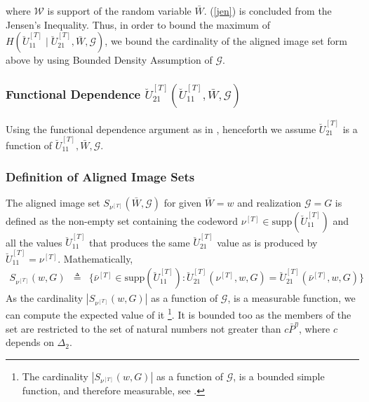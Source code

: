 \documentclass[11pt]{article}
\begin{document}
where $\mathcal{W}$ is support of the random variable $\bar{W}$. (\ref{jen}) is concluded from the Jensen's Inequality. Thus, in order to bound the maximum of $H(\breve{U}_{11}^{[T]}\mid \breve{U}_{21}^{[T]},\bar{W},\mathcal{G})$, we bound the cardinality of the aligned image set form above by using Bounded Density Assumption of $\mathcal{G}$. 

\subsubsection{Functional Dependence $\breve{U}_{21}^{[T]}(\breve{U}_{11}^{[T]},\bar{W},\mathcal{G})$} \label{funcdep}
Using the functional dependence argument as in \cite{Arash_Jafar_sumset}, henceforth we assume $\breve{U}_{21}^{[T]}$ is a function of $\breve{U}_{11}^{[T]},\bar{W},\mathcal{G}$.

\subsubsection { Definition of Aligned Image Sets} \label {defrt}
The aligned image set $S_{\nu^{[T]}}(\bar{W},\mathcal{G})$ for given $\bar{W}=w$ and realization $\mathcal{G}=G$  is defined as the non-empty set containing the codeword $\nu^{[T]}\in \mbox{supp}(\breve{U}_{11}^{[T]})$  and all the values   $\breve{U}_{11}^{[T]}$ that produces the same $\breve{U}_{21}^{[T]}$ value as is produced by $\breve{U}_{11}^{[T]}=\nu^{[T]}$. Mathematically,
\begin{eqnarray}
S_{\nu^{[T]}}({w},{G})&\triangleq&\{\bar{\nu}^{[T]}\in\mbox{supp}(\breve{U}_{11}^{[T]}): \breve{U}_{21}^{[T]}(\nu^{[T]},w,{G})=\breve{U}_{21}^{[T]}(\bar{\nu}^{[T]},w,{G})\}
\end{eqnarray}
As the cardinality $|S_{\nu^{[T]}}({w},{G})|$ as a function of $\mathcal{G}$, is a measurable function, we can compute the expected value of it \footnote{The cardinality $|S_{\nu^{[T]}}({w},{G})|$ as a function of $\mathcal{G}$, is a bounded simple function, and therefore measurable, see \cite{Arash_Jafar_PN}.}. It is bounded too as the members of the set are restricted to  the set of natural numbers not greater than $c\bar{P}^{\eta}$, where $c$  depends on $\Delta_2$. 
\end{document}
